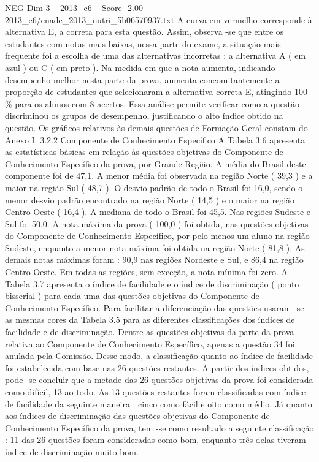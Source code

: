 \begin{textsample}{NEG Dim 3 – 2013\_c6 – Score -2.00 – 2013\_c6/enade\_2013\_nutri\_5b06570937.txt}
A curva em vermelho corresponde à alternativa E, a correta para esta questão.
Assim, observa -se que entre os estudantes com notas mais baixas, nessa parte do exame, a situação mais frequente foi a escolha de uma das alternativas incorretas : a alternativa A ( em azul ) ou C ( em preto ).
Na medida em que a nota aumenta, indicando desempenho melhor nesta parte da prova, aumenta concomitantemente a proporção de estudantes que selecionaram a alternativa correta E, atingindo 100 \% para os alunos com 8 acertos.
Essa análise permite verificar como a questão discriminou os grupos de desempenho, justificando o alto índice obtido na questão.
Os gráficos relativos às demais questões de Formação Geral constam do Anexo I. 3.2.2 Componente de Conhecimento Específico A Tabela 3.6 apresenta as estatísticas básicas em relação às questões objetivas do Componente de Conhecimento Específico da prova, por Grande Região.
A média do Brasil deste componente foi de 47,1.
A menor média foi observada na região Norte ( 39,3 ) e a maior na região Sul ( 48,7 ).
O desvio padrão de todo o Brasil foi 16,0, sendo o menor desvio padrão encontrado na região Norte ( 14,5 ) e o maior na região Centro-Oeste ( 16,4 ).
A mediana de todo o Brasil foi 45,5.
Nas regiões Sudeste e Sul foi 50,0.
A nota máxima da prova ( 100,0 ) foi obtida, nas questões objetivas do Componente de Conhecimento Específico, por pelo menos um aluno na região Sudeste, enquanto a menor nota máxima foi obtida na região Norte ( 81,8 ).
As demais notas máximas foram : 90,9 nas regiões Nordeste e Sul, e 86,4 na região Centro-Oeste.
Em todas as regiões, sem exceção, a nota mínima foi zero.
A Tabela 3.7 apresenta o índice de facilidade e o índice de discriminação ( ponto bisserial ) para cada uma das questões objetivas do Componente de Conhecimento Específico.
Para facilitar a diferenciação das questões usaram -se as mesmas cores da Tabela 3.5 para as diferentes classificações dos índices de facilidade e de discriminação.
Dentre as questões objetivas da parte da prova relativa ao Componente de Conhecimento Específico, apenas a questão 34 foi anulada pela Comissão.
Desse modo, a classificação quanto ao índice de facilidade foi estabelecida com base nas 26 questões restantes.
A partir dos índices obtidos, pode -se concluir que a metade das 26 questões objetivas da prova foi considerada como difícil, 13 ao todo.
As 13 questões restantes foram classificadas com índice de facilidade da seguinte maneira : cinco como fácil e oito como médio.
Já quanto aos índices de discriminação das questões objetivas do Componente de Conhecimento Específico da prova, tem -se como resultado a seguinte classificação : 11 das 26 questões foram consideradas como bom, enquanto três delas tiveram índice de discriminação muito bom.

\end{textsample}
